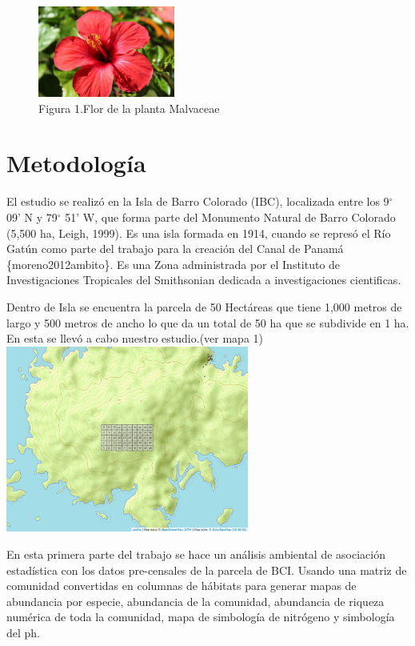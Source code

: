 \documentclass[11pt,]{article}
\begin{document}
\begin{figure}
\centering
\includegraphics[width=0.40000\textwidth]{Hibiscus-Malvaceae.jpg}
\caption{Figura 1.Flor de la planta Malvaceae}
\end{figure}

\section{Metodología}\label{metodologuxeda}

El estudio se realizó en la Isla de Barro Colorado (IBC), localizada
entre los 9\(^{\circ}\) 09' N y 79\(^{\circ}\) 51' W, que forma parte
del Monumento Natural de Barro Colorado (5,500 ha, Leigh, 1999). Es una
isla formada en 1914, cuando se represó el Río Gatún como parte del
trabajo para la creación del Canal de Panamá \{moreno2012ambito\}. Es
una Zona administrada por el Instituto de Investigaciones Tropicales del
Smithsonian dedicada a investigaciones cientificas.

Dentro de Isla se encuentra la parcela de 50 Hectáreas que tiene 1,000
metros de largo y 500 metros de ancho lo que da un total de 50 ha que se
subdivide en 1 ha. En esta se llevó a cabo nuestro estudio.(ver mapa 1)
\includegraphics[width=0.60000\textwidth]{mapa_cuadros.png}

En esta primera parte del trabajo se hace un análisis ambiental de
asociación estadística con los datos pre-censales de la parcela de BCI.
Usando una matriz de comunidad convertidas en columnas de hábitats para
generar mapas de abundancia por especie, abundancia de la comunidad,
abundancia de riqueza numérica de toda la comunidad, mapa de simbología
de nitrógeno y simbología del ph.
\end{document}

